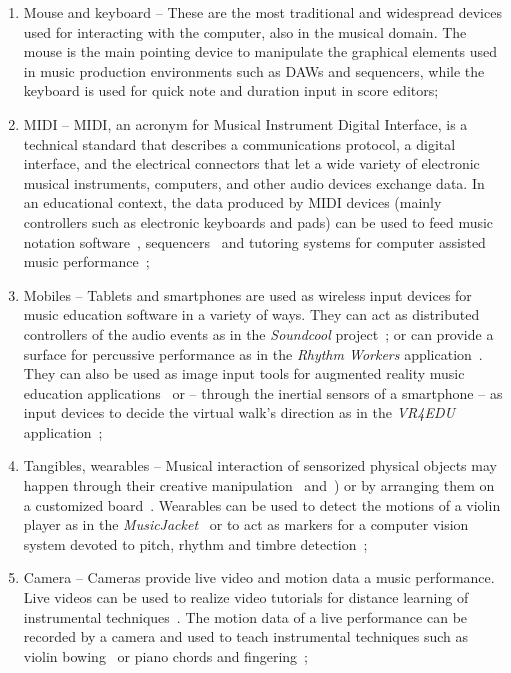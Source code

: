 \documentclass[journal]{IEEEtran}
\newcommand{\node}[1]{{\fontfamily{cmss}\selectfont #1}}
\begin{document}
\begin{enumerate}[label=1.\arabic*.,leftmargin=0.7cm,listparindent=-\leftmargin, start=0]
\begin{enumerate}[label=1.1.\arabic*.,leftmargin=0.9cm,listparindent=-\leftmargin, start=0]
\item \node{Mouse and keyboard} -- These are the most traditional and widespread devices used for interacting with the computer, also in the musical domain. The mouse is the main pointing device to manipulate the graphical elements used in music production environments such as DAWs and sequencers, while the keyboard is used for quick note and duration input in score editors;
\item \node{MIDI} -- MIDI, an acronym for Musical Instrument Digital Interface, is a technical standard that describes a communications protocol, a digital interface, and the electrical connectors that let a wide variety of electronic musical instruments, computers, and other audio devices exchange data. In an educational context, the data produced by MIDI devices (mainly controllers such as electronic keyboards and pads) can be used to feed music notation software~\cite{schroth2009using}, sequencers~\cite{mcdowall2003music} and tutoring systems for computer assisted music performance~\cite{barakonyi2005augmented};
\item \node{Mobiles} -- Tablets and smartphones are used as wireless input devices for music education software in a variety of ways. They can act as distributed controllers of the audio events as in the \textit{Soundcool} project~\cite{berbel2017sound}; or can provide a surface for percussive performance as in the \textit{Rhythm Workers} application~\cite{begel2018rhythm}. They can also be used as image input tools for augmented reality music education applications~\cite{rusinol2018augmented} or -- through the inertial sensors of a smartphone -- as input devices to decide the virtual walk's direction as in the \textit{VR4EDU} application~\cite{degli2019mobile};
\item \node{Tangibles, wearables} -- Musical interaction of sensorized physical objects may happen through their creative manipulation~\cite{weinberg2002beatbug} and~\cite{bakker2010moso}) or by arranging them on a customized board~\cite{parra2014}. Wearables can be used to detect the motions of a violin player as in the \textit{MusicJacket}~\cite{johnson2010musicjacket} or to act as markers for a computer vision system devoted to pitch, rhythm and timbre detection~\cite{martins2015teaching};
\item \node{Camera} -- Cameras provide live video and motion data a music performance. Live videos can be used to realize video tutorials for distance learning of instrumental techniques~\cite{palazon2014vodcasting}. The motion data of a live performance can be recorded by a camera and used to teach instrumental techniques such as violin bowing~\cite{van2009towards} or piano chords and fingering~\cite{goodwin2013key};

\end{enumerate}
\end{enumerate}
\end{document}
